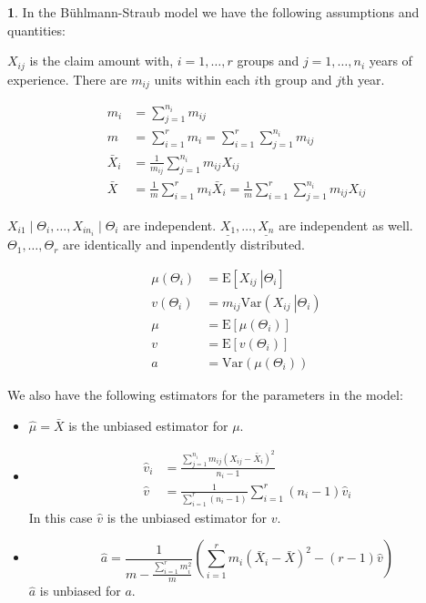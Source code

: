 \documentclass[english,12pt]{article}
\theoremstyle{plain}
\theoremstyle{definition}
\theoremstyle{definition} %
\newtheorem*{recallenv}{\protect\recallname}
\newcommand{\recall}[1]{\begin{recallenv} #1 \end{recallenv} }
\providecommand{\recallname}{Recall}
\newcommand{\brac}[1]{\left(#1\right)} %
\newcommand{\ex}[1]{\mbox{E} \left[ #1 \right]}
\newcommand{\var}[1]{\mbox{Var} \left( #1 \right)}
\newcommand{\condex}[2]{\mbox{E} \left[ \left. #1 \ \right\vert \left. #2 \right. \right]}
\newcommand{\condvar}[2]{\mbox{Var} \left( \left. #1 \ \right\lvert \left. #2 \right. \right)}
\begin{document}
\recall{
In the B\"{u}hlmann-Straub model we have the following assumptions and quantities:

$X_{ij}$ is the claim amount with, $i=1,\ldots,r$ groups and $j=1,\ldots,n_i$ years of experience.  There are $m_{ij}$ units within each $i$th group and $j$th year.

\begin{align*}
m_i&=\sum_{j=1}^{n_i}m_{ij}\\
m&=\sum_{i=1}^rm_i
=\sum_{i=1}^r\sum_{j=1}^{n_i}m_{ij}\\
\bar{X}_i&=\frac{1}{m_{ij}}\sum_{j=1}^{n_i}m_{ij}X_{ij}\\
\bar{X}&=\frac{1}{m}\sum_{i=1}^rm_i\bar{X}_i
=\frac{1}{m}\sum_{i=1}^r\sum_{j=1}^{n_i}m_{ij}X_{ij}
\end{align*}

$X_{i1}\mid\Theta_i,\ldots,X_{in_i}\mid\Theta_i$ are independent.  $\underline{X_1},\ldots,\underline{X_n}$ are independent as well.  $\Theta_1,\ldots,\Theta_r$ are identically and inpendently distributed.

\begin{align*}
\mu(\Theta_i)&=\condex{X_{ij}}{\Theta_i}\\
v(\Theta_i)&=m_{ij}\condvar{X_{ij}}{\Theta_i}\\
\mu&=\ex{\mu(\Theta_i)}\\
v&=\ex{v(\Theta_i)}\\
a&=\var{\mu(\Theta_i)}
\end{align*}

We also have the following estimators for the parameters in the model:
\begin{itemize}
\item $\hat\mu=\bar X$ is the unbiased estimator for $\mu$.

\item
\begin{align*}
\hat{v}_i&=\frac{\sum_{j=1}^{n_i}m_{ij}(X_{ij}-\bar{X}_i)^2}{n_i-1}\\
\hat{v}&=\frac{1}{\sum\limits_{i=1}^r(n_i-1)}\sum\limits_{i=1}^r(n_i-1)\hat{v}_i
\end{align*}
In this case $\hat{v}$ is the unbiased estimator for $v$.

\item 
\[\hat{a}=\frac{1}{m-\frac{\sum\limits_{i=1}^r m_i^2}{m}}\brac{\sum\limits_{i=1}^rm_i(\bar{X}_i-\bar{X})^2-(r-1)\hat{v}}\]
$\hat{a}$ is unbiased for $a$.
\end{itemize}
}
\end{document}
